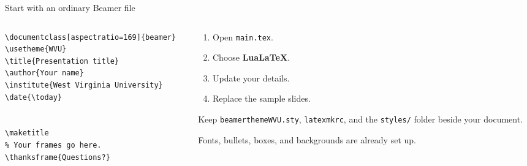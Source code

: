 \begin{frame}[fragile]{Start with an ordinary Beamer file}
  \begin{columns}[T,onlytextwidth]
    \begin{column}{.56\textwidth}
      \small
\begin{verbatim}
\documentclass[aspectratio=169]{beamer}
\usetheme{WVU}
\title{Presentation title}
\author{Your name}
\institute{West Virginia University}
\date{\today}


\maketitle
% Your frames go here.
\thanksframe{Questions?}

\end{verbatim}
    \end{column}
    \begin{column}{.40\textwidth}
      \begin{enumerate}
        \item Open \texttt{main.tex}.
        \item Choose \textbf{LuaLaTeX}.
        \item Update your details.
        \item Replace the sample slides.
      \end{enumerate}
      \medskip
      Keep \texttt{beamerthemeWVU.sty}, \texttt{latexmkrc}, and the
      \texttt{styles/} folder beside your document.
      \medskip

      Fonts, bullets, boxes, and backgrounds are already set up.
    \end{column}
  \end{columns}
\end{frame}

